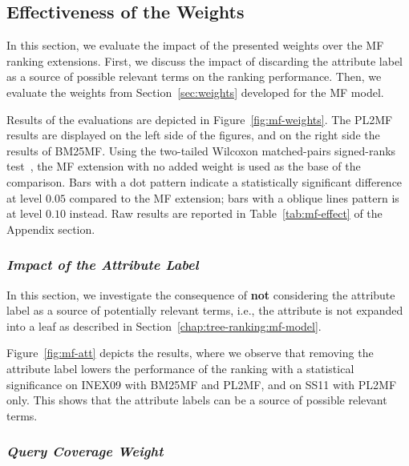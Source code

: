 

\subsection{Effectiveness of the Weights}
\label{sec:weights-effectiveness}

In this section, we evaluate the impact of the presented weights over the \gls{MF} ranking extensions. First, we discuss the impact of discarding the attribute label as a source of possible relevant terms on the ranking performance. Then, we evaluate the weights from Section~\ref{sec:weights} developed for the \gls{MF} model.

Results of the evaluations are depicted in Figure~\ref{fig:mf-weights}. The \gls{PL2MF} results are displayed on the left side of the figures, and on the right side the results of \gls{BM25MF}. Using the two-tailed Wilcoxon matched-pairs signed-ranks test~\cite{sheskin:2003:CRC,buttcher:2010:IRI:1869919}, the \gls{MF} extension with no added weight is used as the base of the comparison. Bars with a dot pattern indicate a statistically significant difference at level $0.05$ compared to the \gls{MF} extension; bars with a oblique lines pattern is at level $0.10$ instead. Raw results are reported in Table~\ref{tab:mf-effect} of the Appendix section.

\subsubsection{\emph{Impact of the Attribute Label}}
\label{sec:with-att}

In this section, we investigate the consequence of \textbf{not} considering the attribute label as a source of potentially relevant terms, i.e., the attribute is not expanded into a leaf as described in Section~\ref{chap:tree-ranking:mf-model}.

Figure~\ref{fig:mf-att} depicts the results, where we observe that removing the attribute label lowers the performance of the ranking with a statistical significance on INEX09 with \gls{BM25MF} and \gls{PL2MF}, and on SS11 with \gls{PL2MF} only. This shows that the attribute labels can be a source of possible relevant terms.

\subsubsection{\emph{Query Coverage Weight}}
\label{sec:qc-weight-effect}

